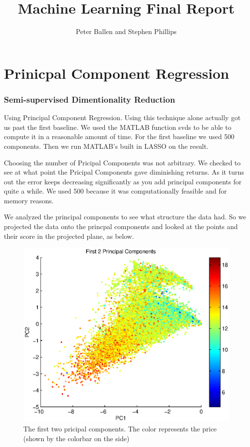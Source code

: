 \documentclass[a4paper,10pt]{article}
\title{Machine Learning Final Report}
\author{Peter Ballen and Stephen Phillips}
\begin{document}
\maketitle

\section{Prinicpal Component Regression}
\subsubsection*{Semi-supervised Dimentionality Reduction}
Using Principal Component Regression. Using this technique alone actually got us past the first baseline. We used the MATLAB function svds to be able to compute it in a reasonable amount of time. For the first baseline we used 500 components. Then we run MATLAB's built in LASSO on the result.

Choosing the number of Pricipal Components was not arbitrary. We checked to see at what point the Pricipal Components gave diminishing returns. As it turns out the error keeps decreasing significantly as you add principal components for quite a while. We used 500 because it was computationally feasible and for memory reasons.

We analyzed the principal components to see what structure the data had. So we projected the data onto the princpal components and looked at the points and their score in the projected plane, as below.

\begin{figure}[H]
 \centering
 \includegraphics[scale=0.5]{First2PCs.eps}
 \caption{The first two pricipal components. The color represents the price (shown by the colorbar on the side)}
\end{figure}
\end{document}
